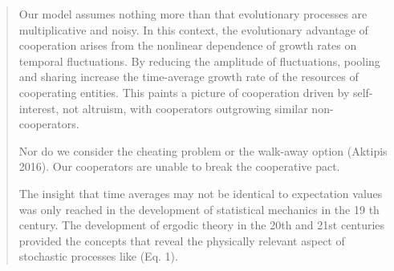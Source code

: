 \documentclass[a4paper,10pt]{article}
\begin{document}
\begin{quotation} \cite{peters-cooperation2019.03.04}
    Our model assumes nothing more than that evolutionary processes are multiplicative and noisy.
    In this context, the evolutionary advantage of cooperation arises from the nonlinear dependence of growth rates on temporal fluctuations.
    By reducing the amplitude of fluctuations, pooling and sharing increase the time-average growth rate of the resources of cooperating entities.
    This paints a picture of cooperation driven by self-interest, not altruism, with cooperators outgrowing similar non-cooperators.
    
    Nor do we consider the cheating problem or the walk-away option (Aktipis 2016).
    Our cooperators are unable to break the cooperative pact.
    
    The insight that time averages may not be identical to expectation values was only reached in the development of statistical mechanics in the 19 th century.
    The development of ergodic theory in the 20th and 21st centuries provided the concepts that reveal the physically relevant aspect of stochastic processes like (Eq. 1).
\end{quotation}

\\
\end{document}
